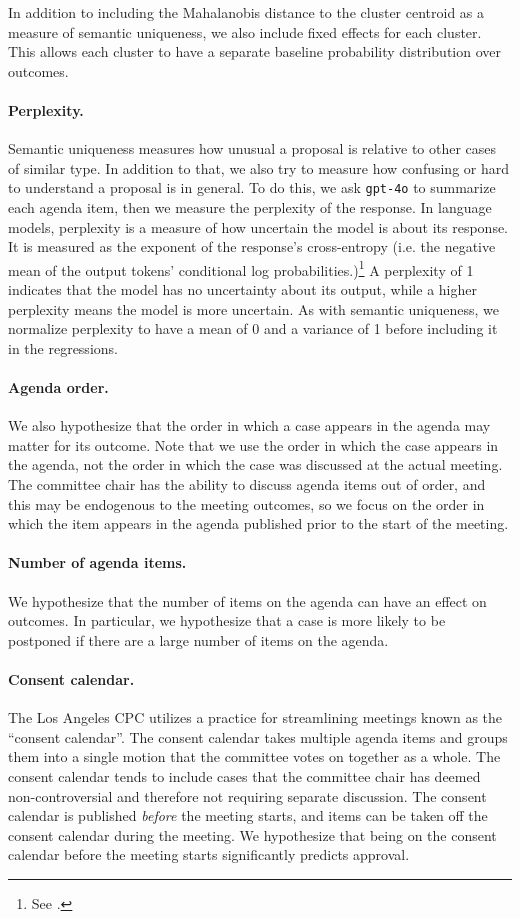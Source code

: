 In addition to including the Mahalanobis distance to the cluster centroid as a measure of semantic uniqueness, we also include fixed effects for each cluster. This allows each cluster to have a separate baseline probability distribution over outcomes.

\paragraph{Perplexity.} Semantic uniqueness measures how unusual a proposal is relative to other cases of similar type. In addition to that, we also try to measure how confusing or hard to understand a proposal is in general. To do this, we ask \texttt{gpt-4o} to summarize each agenda item, then we measure the perplexity of the response. In language models, perplexity is a measure of how uncertain the model is about its response. It is measured as the exponent of the response's cross-entropy  (i.e. the negative mean of the output tokens' conditional log probabilities.)\footnote{See \citet{jm2}.} A perplexity of 1 indicates that the model has no uncertainty about its output, while a higher perplexity means the model is more uncertain. As with semantic uniqueness, we normalize perplexity to have a mean of 0 and a variance of 1 before including it in the regressions.

\paragraph{Agenda order.} We also hypothesize that the order in which a case appears in the agenda may matter for its outcome. Note that we use the order in which the case appears in the agenda, not the order in which the case was discussed at the actual meeting. The committee chair has the ability to discuss agenda items out of order, and this may be endogenous to the meeting outcomes, so we focus on the order in which the item appears in the agenda published prior to the start of the meeting.

\paragraph{Number of agenda items.} We hypothesize that the number of items on the agenda can have an effect on outcomes. In particular, we hypothesize that a case is more likely to be postponed if there are a large number of items on the agenda.

\paragraph{Consent calendar.} The Los Angeles CPC utilizes a practice for streamlining meetings known as the ``consent calendar''. The consent calendar takes multiple agenda items and groups them into a single motion that the committee votes on together as a whole. The consent calendar tends to include cases that the committee chair has deemed non-controversial and therefore not requiring separate discussion. The consent calendar is published \emph{before} the meeting starts, and items can be taken off the consent calendar during the meeting. We hypothesize that being on the consent calendar before the meeting starts significantly predicts approval.

